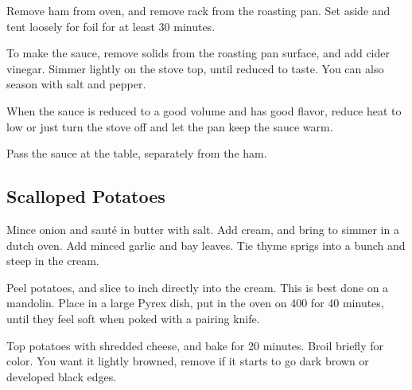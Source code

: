 \begin{recipe}
Remove ham from oven, and remove rack from the roasting pan. Set aside and tent loosely for foil for at least 30 minutes.

To make the sauce, remove solids from the roasting pan surface, and add cider vinegar. Simmer lightly on the stove top, until reduced to taste. You can also season with salt and pepper.

When the sauce is reduced to a good volume and has good flavor, reduce heat to low or just turn the stove off and let the pan keep the sauce warm.

Pass the sauce at the table, separately from the ham.

\subsection{Scalloped Potatoes}



Mince onion and sauté in butter with salt. Add cream, and bring to simmer in a dutch oven. Add minced garlic and bay leaves. Tie thyme sprigs into a bunch and steep in the cream.


Peel potatoes, and slice to  inch directly into the cream. This is best done on a mandolin. Place in a large Pyrex dish, put in the oven on 400 for 40 minutes, until they feel soft when poked with a pairing knife.


Top potatoes with shredded cheese, and bake for 20 minutes. Broil briefly for color. You want it lightly browned, remove if it starts to go dark brown or developed black edges. 

\end{recipe}
